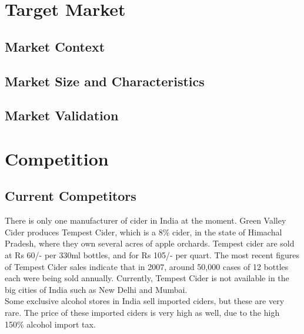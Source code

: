\documentclass[11pt]{article}
\begin{document}
\newpage
\section{Target Market}
  \subsection{Market Context}
  \subsection{Market Size and Characteristics}
  \subsection{Market Validation}

\newpage
\section{Competition}
	\subsection{Current Competitors}
There is only one manufacturer of cider in India at the moment. Green Valley Cider produces Tempest Cider, which is a 8\% cider, in the state of Himachal Pradesh, where they own several acres of apple orchards. Tempest cider are sold at Rs 60/- per 330ml bottles, and for Rs 105/- per quart. The most recent figures of Tempest Cider sales indicate that in 2007, around 50,000 cases of 12 bottles each were being sold annually. Currently, Tempest Cider is not available in the big cities of India such as New Delhi and Mumbai. \\

\noindent Some exclusive alcohol stores in India sell imported ciders, but these are very rare. The price of these imported ciders is very high as well, due to the high 150\% alcohol import tax.
\end{document}
